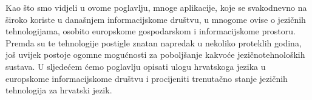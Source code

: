 \begin{multicols}{2}
Kao što smo vidjeli u ovome poglavlju, mnoge aplikacije, koje se svakodnevno na široko koriste u današnjem informacijskome društvu, u mnogome ovise o jezičnih tehnologijama, osobito europskome gospodarskom i informacijskome prostoru. Premda su te tehnologije postigle znatan napredak u nekoliko proteklih godina, još uvijek postoje ogomne mogućnosti za poboljšanje kakvoće jezičnotehnoloških sustava. U sljedećem ćemo poglavlju opisati ulogu hrvatskoga jezika u europskome informacijskome društvu i procijeniti trenutačno stanje jezičnih tehnologija za hrvatski jezik.

\end{multicols}

\clearpage



